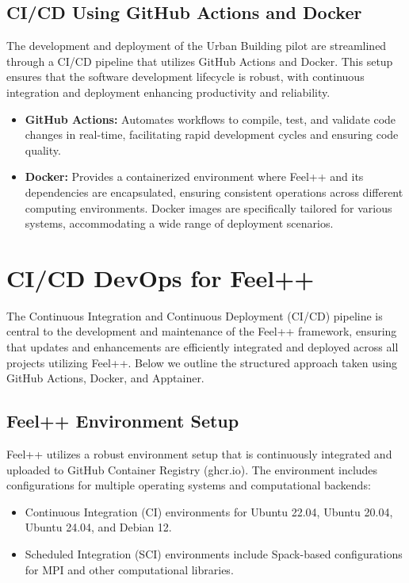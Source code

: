 \documentclass[runningheads]{llncs}
\begin{document}
\subsection{CI/CD Using GitHub Actions and Docker}
The development and deployment of the Urban Building pilot are streamlined through a CI/CD pipeline that utilizes GitHub Actions and Docker. This setup ensures that the software development lifecycle is robust, with continuous integration and deployment enhancing productivity and reliability.

\begin{itemize}
    \item \textbf{GitHub Actions:} Automates workflows to compile, test, and validate code changes in real-time, facilitating rapid development cycles and ensuring code quality.
    \item \textbf{Docker:} Provides a containerized environment where Feel++ and its dependencies are encapsulated, ensuring consistent operations across different computing environments. Docker images are specifically tailored for various systems, accommodating a wide range of deployment scenarios.
\end{itemize}

% 

\section{CI/CD DevOps for Feel++}
The Continuous Integration and Continuous Deployment (CI/CD) pipeline is central to the development and maintenance of the Feel++ framework, ensuring that updates and enhancements are efficiently integrated and deployed across all projects utilizing Feel++. Below we outline the structured approach taken using GitHub Actions, Docker, and Apptainer.

\subsection{Feel++ Environment Setup}
Feel++ utilizes a robust environment setup that is continuously integrated and uploaded to GitHub Container Registry (ghcr.io). The environment includes configurations for multiple operating systems and computational backends:
\begin{itemize}
    \item Continuous Integration (CI) environments for Ubuntu 22.04, Ubuntu 20.04, Ubuntu 24.04, and Debian 12.
    \item Scheduled Integration (SCI) environments include Spack-based configurations for MPI and other computational libraries.
\end{itemize}
\end{document}
